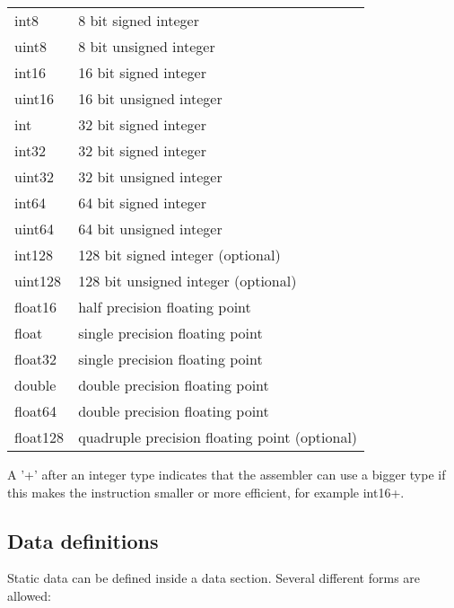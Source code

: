 \documentclass[forwardcom.tex]{subfiles}
\begin{document}
\begin{tabular}{|p{15mm}p{125mm}|}
\hline
int8    & 8 bit signed integer\\
uint8   & 8 bit unsigned integer\\
int16   & 16 bit signed integer\\
uint16  & 16 bit unsigned integer\\
int     & 32 bit signed integer\\
int32   & 32 bit signed integer\\
uint32  & 32 bit unsigned integer\\
int64   & 64 bit signed integer\\
uint64  & 64 bit unsigned integer\\
int128  & 128 bit signed integer (optional)\\
uint128 & 128 bit unsigned integer (optional)\\
float16 & half precision floating point\\
float   & single precision floating point\\
float32 & single precision floating point\\
double  & double precision floating point\\
float64 & double precision floating point\\
float128 & quadruple precision floating point (optional)\\
\hline
\end{tabular}
\vv

A '+' after an integer type indicates that the assembler can use a bigger type if this makes
the instruction smaller or more efficient, for example int16+.
\vv


\subsection{Data definitions} \label{assemblyDataDefinitions}
Static data can be defined inside a data section. Several different forms are allowed:
\vv
\end{document}
